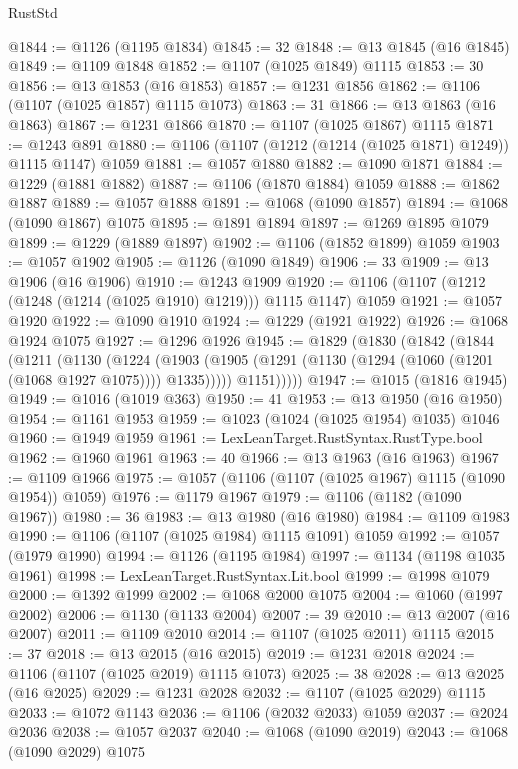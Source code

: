 \begin{lexlean}{RustStd}
\begin{coremodule}
@1844 := @1126 (@1195 @1834)
@1845 := 32
@1848 := @13 @1845 (@16 @1845)
@1849 := @1109 @1848
@1852 := @1107 (@1025 @1849) @1115
@1853 := 30
@1856 := @13 @1853 (@16 @1853)
@1857 := @1231 @1856
@1862 := @1106 (@1107 (@1025 @1857) @1115 @1073)
@1863 := 31
@1866 := @13 @1863 (@16 @1863)
@1867 := @1231 @1866
@1870 := @1107 (@1025 @1867) @1115
@1871 := @1243 @891
@1880 := @1106 (@1107 (@1212 (@1214 (@1025 @1871) @1249)) @1115 @1147) @1059
@1881 := @1057 @1880
@1882 := @1090 @1871
@1884 := @1229 (@1881 @1882)
@1887 := @1106 (@1870 @1884) @1059
@1888 := @1862 @1887
@1889 := @1057 @1888
@1891 := @1068 (@1090 @1857)
@1894 := @1068 (@1090 @1867) @1075
@1895 := @1891 @1894
@1897 := @1269 @1895 @1079
@1899 := @1229 (@1889 @1897)
@1902 := @1106 (@1852 @1899) @1059
@1903 := @1057 @1902
@1905 := @1126 (@1090 @1849)
@1906 := 33
@1909 := @13 @1906 (@16 @1906)
@1910 := @1243 @1909
@1920 := @1106 (@1107 (@1212 (@1248 (@1214 (@1025 @1910) @1219))) @1115 @1147) @1059
@1921 := @1057 @1920
@1922 := @1090 @1910
@1924 := @1229 (@1921 @1922)
@1926 := @1068 @1924 @1075
@1927 := @1296 @1926
@1945 := @1829
    (@1830
      (@1842
        (@1844
          (@1211
            (@1130
              (@1224
                (@1903 (@1905 (@1291 (@1130 (@1294 (@1060 (@1201 (@1068 @1927 @1075)))) @1335)))))
              @1151)))))
@1947 := @1015 (@1816 @1945)
@1949 := @1016 (@1019 @363)
@1950 := 41
@1953 := @13 @1950 (@16 @1950)
@1954 := @1161 @1953
@1959 := @1023 (@1024 (@1025 @1954) @1035) @1046
@1960 := @1949 @1959
@1961 := LexLeanTarget.RustSyntax.RustType.bool
@1962 := @1960 @1961
@1963 := 40
@1966 := @13 @1963 (@16 @1963)
@1967 := @1109 @1966
@1975 := @1057 (@1106 (@1107 (@1025 @1967) @1115 (@1090 @1954)) @1059)
@1976 := @1179 @1967
@1979 := @1106 (@1182 (@1090 @1967))
@1980 := 36
@1983 := @13 @1980 (@16 @1980)
@1984 := @1109 @1983
@1990 := @1106 (@1107 (@1025 @1984) @1115 @1091) @1059
@1992 := @1057 (@1979 @1990)
@1994 := @1126 (@1195 @1984)
@1997 := @1134 (@1198 @1035 @1961)
@1998 := LexLeanTarget.RustSyntax.Lit.bool
@1999 := @1998 @1079
@2000 := @1392 @1999
@2002 := @1068 @2000 @1075
@2004 := @1060 (@1997 @2002)
@2006 := @1130 (@1133 @2004)
@2007 := 39
@2010 := @13 @2007 (@16 @2007)
@2011 := @1109 @2010
@2014 := @1107 (@1025 @2011) @1115
@2015 := 37
@2018 := @13 @2015 (@16 @2015)
@2019 := @1231 @2018
@2024 := @1106 (@1107 (@1025 @2019) @1115 @1073)
@2025 := 38
@2028 := @13 @2025 (@16 @2025)
@2029 := @1231 @2028
@2032 := @1107 (@1025 @2029) @1115
@2033 := @1072 @1143
@2036 := @1106 (@2032 @2033) @1059
@2037 := @2024 @2036
@2038 := @1057 @2037
@2040 := @1068 (@1090 @2019)
@2043 := @1068 (@1090 @2029) @1075

\end{coremodule}
\end{lexlean}
